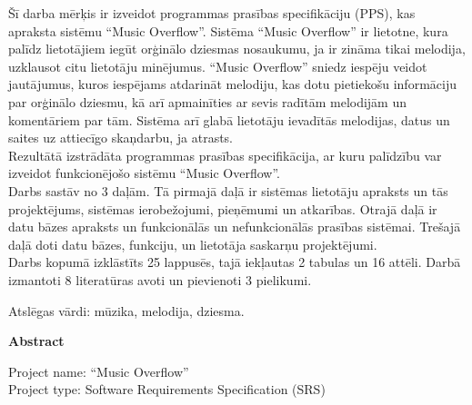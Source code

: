 \documentclass[12pt]{article}
\begin{document}
Šī darba mērķis ir izveidot programmas prasības specifikāciju (PPS), kas apraksta sistēmu ``Music Overflow''.
Sistēma ``Music Overflow'' ir lietotne, kura palīdz lietotājiem iegūt orģinālo dziesmas nosaukumu, ja ir zināma tikai melodija, uzklausot citu lietotāju minējumus. ``Music Overflow'' sniedz iespēju veidot jautājumus, kuros iespējams atdarināt melodiju, kas dotu pietiekošu informāciju par orģinālo dziesmu, kā arī apmainīties ar sevis radītām melodijām un komentāriem par tām. Sistēma arī glabā lietotāju ievadītās melodijas, datus un saites uz attiecīgo skaņdarbu, ja atrasts. \\
\indent Rezultātā izstrādāta programmas prasības specifikācija, ar kuru palīdzību var izveidot funkcionējošo sistēmu ``Music Overflow''. \\
\indent Darbs sastāv no 3 daļām. Tā pirmajā daļā ir sistēmas lietotāju apraksts un tās projektējums, sistēmas ierobežojumi, pieņēmumi un atkarības. Otrajā daļā ir datu bāzes apraksts un funkcionālās un nefunkcionālās prasības sistēmai. Trešajā daļā doti datu bāzes, funkciju, un lietotāja saskarņu projektējumi. \\
\indent Darbs kopumā izklāstīts 25 lappusēs, tajā iekļautas 2 tabulas un 16 attēli.  Darbā izmantoti 8 literatūras avoti un pievienoti 3 pielikumi.

Atslēgas vārdi: mūzika, melodija, dziesma.

\pagebreak

\begin{center}
\textbf{\large Abstract}\\
\end{center}

\indent Project name: ``Music Overflow''\\
\indent Project type: Software Requirements Specification (SRS)\\
\end{document}
